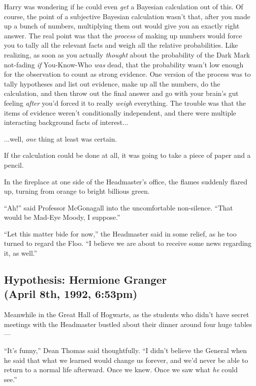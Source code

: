 Harry was wondering if he could even \emph{get} a Bayesian calculation out of this. Of course, the point of a subjective Bayesian calculation wasn’t that, after you made up a bunch of numbers, multiplying them out would give you an exactly right answer. The real point was that the \emph{process} of making up numbers would force you to tally all the relevant facts and weigh all the relative probabilities. Like realizing, as soon as you actually \emph{thought} about the probability of the Dark Mark not-fading \emph{if} You-Know-Who \emph{was} dead, that the probability wasn’t low enough for the observation to count as strong evidence. One version of the process was to tally hypotheses and list out evidence, make up all the numbers, do the calculation, and then throw out the final answer and go with your brain’s gut feeling \emph{after} you’d forced it to really \emph{weigh} everything. The trouble was that the items of evidence weren’t conditionally independent, and there were multiple interacting background facts of interest...

...well, \emph{one} thing at least was certain.

If the calculation could be done at all, it was going to take a piece of paper and a pencil.

In the fireplace at one side of the Headmaster’s office, the flames suddenly flared up, turning from orange to bright billious green.

“Ah!” said Professor McGonagall into the uncomfortable non-silence. “That would be Mad-Eye Moody, I suppose.”

“Let this matter bide for now,” the Headmaster said in some relief, as he too turned to regard the Floo. “I believe we are about to receive some news regarding it, as well.”
\sbreak

\subsection{Hypothesis: Hermione Granger\\(April 8th, 1992, 6:53pm)}

Meanwhile in the Great Hall of Hogwarts, as the students who didn’t have secret meetings with the Headmaster bustled about their dinner around four huge tables—

“It’s funny,” Dean Thomas said thoughtfully. “I didn’t believe the General when he said that what we learned would change us forever, and we’d never be able to return to a normal life afterward. Once we knew. Once we saw what \emph{he} could see.”

